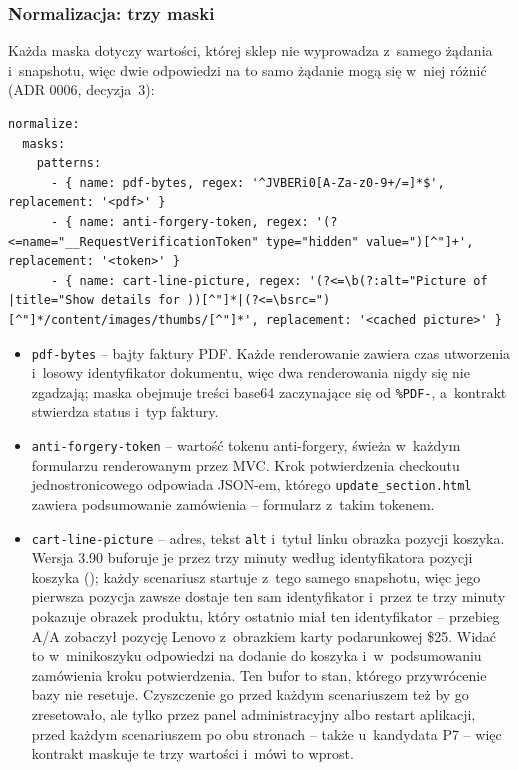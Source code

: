 
\subsubsection{Normalizacja: trzy maski}\label{sec:bench-kontrakt-maski}

Każda maska dotyczy wartości, której sklep nie wyprowadza z~samego żądania i~snapshotu,
więc dwie odpowiedzi na to samo żądanie mogą się w~niej różnić (ADR 0006, decyzja~3):

\begin{lstlisting}
normalize:
  masks:
    patterns:
      - { name: pdf-bytes, regex: '^JVBERi0[A-Za-z0-9+/=]*$', replacement: '<pdf>' }
      - { name: anti-forgery-token, regex: '(?<=name="__RequestVerificationToken" type="hidden" value=")[^"]+', replacement: '<token>' }
      - { name: cart-line-picture, regex: '(?<=\b(?:alt="Picture of |title="Show details for ))[^"]*|(?<=\bsrc=")[^"]*/content/images/thumbs/[^"]*', replacement: '<cached picture>' }
\end{lstlisting}

\begin{itemize}
  \item \texttt{pdf-bytes} -- bajty faktury PDF. Każde renderowanie zawiera czas
    utworzenia i~losowy identyfikator dokumentu, więc dwa renderowania nigdy się nie
    zgadzają; maska obejmuje treści base64 zaczynające się od \texttt{\%PDF-}, a~kontrakt
    stwierdza status i~typ faktury.
  \item \texttt{anti-forgery-token} -- wartość tokenu anti-forgery, świeża w~każdym
    formularzu renderowanym przez MVC. Krok potwierdzenia checkoutu jednostronicowego
    odpowiada JSON-em, którego \texttt{update\_section.html} zawiera podsumowanie
    zamówienia -- formularz z~takim tokenem.
  \item \texttt{cart-line-picture} -- adres, tekst \texttt{alt} i~tytuł linku obrazka
    pozycji koszyka. Wersja 3.90 buforuje je przez trzy minuty według identyfikatora
    pozycji koszyka (); każdy
    scenariusz startuje z~tego samego snapshotu, więc jego pierwsza pozycja zawsze dostaje
    ten sam identyfikator i~przez te trzy minuty pokazuje obrazek produktu, który ostatnio
    miał ten identyfikator -- przebieg A/A zobaczył pozycję Lenovo z~obrazkiem karty
    podarunkowej \$25. Widać to w~minikoszyku odpowiedzi na dodanie do koszyka
    i~w~podsumowaniu zamówienia kroku potwierdzenia. Ten bufor to stan, którego
    przywrócenie bazy nie resetuje. Czyszczenie go przed każdym scenariuszem też by go
    zresetowało, ale tylko przez panel administracyjny albo restart aplikacji, przed
    każdym scenariuszem po obu stronach -- także u~kandydata P7 -- więc kontrakt maskuje
    te trzy wartości i~mówi to wprost.
\end{itemize}

